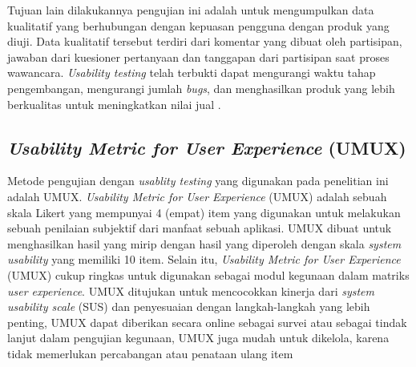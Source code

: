 \par Tujuan lain dilakukannya pengujian ini adalah untuk mengumpulkan data kualitatif yang berhubungan dengan kepuasan pengguna dengan produk yang diuji. Data kualitatif tersebut terdiri dari komentar yang dibuat oleh partisipan, jawaban dari kuesioner pertanyaan dan tanggapan dari partisipan saat proses wawancara. \textit{Usability testing} telah terbukti dapat mengurangi waktu tahap pengembangan, mengurangi jumlah \textit{bugs}, dan menghasilkan produk yang lebih berkualitas untuk meningkatkan nilai jual \citep{Wahl2000}.

\subsection{\textit{Usability Metric for User Experience} (UMUX)}
Metode pengujian dengan \textit{usablity testing} yang digunakan pada penelitian ini adalah UMUX. \textit{Usability Metric for User Experience} (UMUX) adalah sebuah skala Likert yang mempunyai 4 (empat) item yang digunakan untuk melakukan sebuah penilaian subjektif dari manfaat sebuah aplikasi. UMUX dibuat untuk menghasilkan hasil yang mirip dengan hasil yang diperoleh dengan skala \textit{system usability} yang memiliki 10 item. Selain itu, \textit{Usability Metric for User Experience} (UMUX) cukup ringkas untuk digunakan sebagai modul kegunaan dalam matriks \textit{user experience}. UMUX ditujukan untuk mencocokkan kinerja dari \textit{system usability scale} (SUS) dan penyesuaian dengan langkah-langkah yang lebih penting, UMUX dapat diberikan secara online sebagai survei atau sebagai tindak lanjut dalam pengujian kegunaan, UMUX juga mudah untuk dikelola, karena tidak memerlukan percabangan atau penataan ulang item \citep{Finstad2010}


